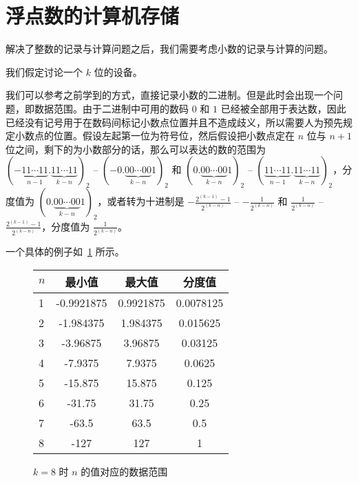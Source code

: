 \section{浮点数的计算机存储}\label{sec:NumberSystemBasics/floating-point-storing}
    解决了整数的记录与计算问题之后，我们需要考虑小数的记录与计算的问题。

    我们假定讨论一个 $k$ 位的设备。

    我们可以参考之前学到的方式，直接记录小数的二进制。但是此时会出现一个问题，即数据范围。由于二进制中可用的数码 $0$ 和 $1$ 已经被全部用于表达数，因此已经没有记号用于在数码间标记小数点位置并且不造成歧义，所以需要人为预先规定小数点的位置。假设左起第一位为符号位，然后假设把小数点定在 $n$ 位与 $n + 1$ 位之间，剩下的为小数部分的话，那么可以表达的数的范围为 $(-\underbrace{11 \cdots 11}_{n-1}.\underbrace{11 \cdots 11}_{k-n})_2$ -- $(-0.\underbrace{00 \cdots 00}_{k-n}1)_2$ 和 $(0.\underbrace{00 \cdots 00}_{k-n}1)_2$ -- $(\underbrace{11 \cdots 11}_{n-1}.\underbrace{11 \cdots 11}_{k-n})_2$，分度值为 $(0.\underbrace{00 \cdots 00}_{k-n}1)_2$，或者转为十进制是 $-\frac{2^{(k-1)}-1}{2^{(k-n)}}$ -- $-\frac{1}{2^{(k-n)}}$ 和 $\frac{1}{2^{(k-n)}}$ -- $\frac{2^{(k-1)}-1}{2^{(k-n)}}$，分度值为 $\frac{1}{2^{(k-n)}}$。

    一个具体的例子如~\ref{fig:NumberSystemBasics/floating-point/data-range} 所示。

    \begin{figure}
        \centering
        \begin{tabular}{lS[table-format=-3.7]S[table-format=-3.7]S[table-format=-3.7]}
            $n$ & 最小值     & 最大值    & 分度值    \\    & -0.9921875 & 0.9921875  & 0.0078125 \\
            2   & -1.984375  & 1.984375   & 0.015625  \\
            3   & -3.96875   & 3.96875    & 0.03125   \\
            4   & -7.9375    & 7.9375     & 0.0625    \\
            5   & -15.875    & 15.875     & 0.125     \\
            6   & -31.75     & 31.75      & 0.25      \\
            7   & -63.5      & 63.5       & 0.5       \\
            8   & -127       & 127        & 1         \\
        \end{tabular}
        \caption{$k = 8$ 时 $n$ 的值对应的数据范围}
        \label{fig:NumberSystemBasics/floating-point/data-range}
    \end{figure}

